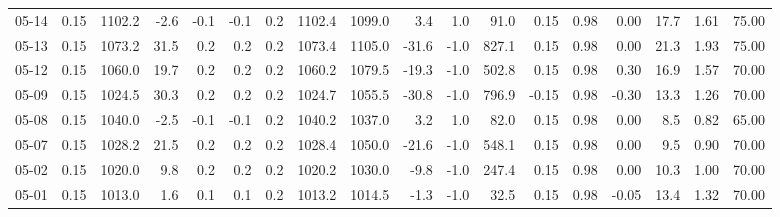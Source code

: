 \begin{threeparttable}
{\begin{tabular}{lrrrrrrrrrrrrrrrrr}
  05-14 &     0.15 & 1102.2 &              -2.6 &              -0.1 &               -0.1 &                0.2 & 1102.4 & 1099.0 &        3.4 &                      1.0 &                91.0 &       0.15 &      0.98 &           0.00 &             17.7 &            1.61 &                  75.00 \\
  05-13 &     0.15 & 1073.2 &              31.5 &               0.2 &                0.2 &                0.2 & 1073.4 & 1105.0 &      -31.6 &                     -1.0 &               827.1 &       0.15 &      0.98 &           0.00 &             21.3 &            1.93 &                  75.00 \\
  05-12 &     0.15 & 1060.0 &              19.7 &               0.2 &                0.2 &                0.2 & 1060.2 & 1079.5 &      -19.3 &                     -1.0 &               502.8 &       0.15 &      0.98 &           0.30 &             16.9 &            1.57 &                  70.00 \\
  05-09 &     0.15 & 1024.5 &              30.3 &               0.2 &                0.2 &                0.2 & 1024.7 & 1055.5 &      -30.8 &                     -1.0 &               796.9 &      -0.15 &      0.98 &          -0.30 &             13.3 &            1.26 &                  70.00 \\
  05-08 &     0.15 & 1040.0 &              -2.5 &              -0.1 &               -0.1 &                0.2 & 1040.2 & 1037.0 &        3.2 &                      1.0 &                82.0 &       0.15 &      0.98 &           0.00 &              8.5 &            0.82 &                  65.00 \\
  05-07 &     0.15 & 1028.2 &              21.5 &               0.2 &                0.2 &                0.2 & 1028.4 & 1050.0 &      -21.6 &                     -1.0 &               548.1 &       0.15 &      0.98 &           0.00 &              9.5 &            0.90 &                  70.00 \\
  05-02 &     0.15 & 1020.0 &               9.8 &               0.2 &                0.2 &                0.2 & 1020.2 & 1030.0 &       -9.8 &                     -1.0 &               247.4 &       0.15 &      0.98 &           0.00 &             10.3 &            1.00 &                  70.00 \\
  05-01 &     0.15 & 1013.0 &               1.6 &               0.1 &                0.1 &                0.2 & 1013.2 & 1014.5 &       -1.3 &                     -1.0 &                32.5 &       0.15 &      0.98 &          -0.05 &             13.4 &            1.32 &                  70.00 \\

\end{tabular}}
\end{threeparttable}
